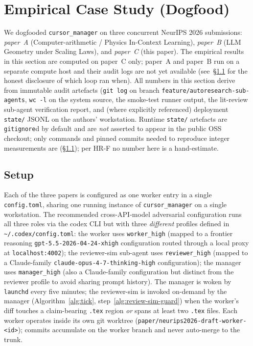 \section{Empirical Case Study (Dogfood)}
\label{sec:case}

We dogfooded \texttt{cursor\_manager} on three concurrent NeurIPS 2026
submissions: \emph{paper~A} (Computer-arithmetic / Physics In-Context
Learning), \emph{paper~B} (LLM Geometry under Scaling Laws), and
\emph{paper~C} (this paper). The empirical results in this section
are computed on paper~C only; paper~A and paper~B run on a separate
compute host and their audit logs are not yet available
(see~\S\ref{sec:case-setup} for the honest disclosure of which loop
ran when). All numbers in this section derive from immutable audit
artefacts (\texttt{git log} on branch
\texttt{feature/autoresearch-sub-agents}, \texttt{wc -l} on the
system source, the smoke-test runner output, the lit-review sub-agent
verification report, and (where explicitly referenced) deployment
\texttt{state/} JSONL on the authors' workstation. Runtime \texttt{state/}
artefacts are \texttt{gitignore}d by default and are \emph{not} asserted
to appear in the public OSS checkout; only commands and pinned commits
needed to reproduce integer measurements are (\S\ref{sec:case-setup});
per HR-F no number here is a hand-estimate.

\subsection{Setup}
\label{sec:case-setup}

Each of the three papers is configured as one
worker entry in a single \texttt{config.toml}, sharing one running
instance of \texttt{cursor\_manager} on a single workstation. The
recommended cross-API-model adversarial configuration runs all three
roles via the codex CLI but with three \emph{different} profiles
defined in \texttt{\textasciitilde/.codex/config.toml}: the worker
uses \texttt{worker\_high} (mapped to a frontier reasoning
\texttt{gpt-5.5-2026-04-24-xhigh} configuration routed through a
local proxy at \texttt{localhost:4002}); the reviewer-sim sub-agent
uses \texttt{reviewer\_high} (mapped to a Claude-family
\texttt{claude-opus-4-7-thinking-high} configuration); the manager
uses \texttt{manager\_high} (also a Claude-family configuration but
distinct from the reviewer profile to avoid sharing prompt history).
The manager is woken by \texttt{launchd} every five minutes; the
reviewer-sim is invoked on-demand by the manager
(Algorithm~\ref{alg:tick}, step~\ref{alg:review-sim-guard}) when the worker's diff touches a
claim-bearing \texttt{.tex} region \emph{or} spans at least two
\texttt{.tex} files. Each worker operates inside its own git
worktree (\texttt{paper/neurips2026-draft-worker-<id>}); commits
accumulate on the worker branch and never auto-merge to the trunk.

